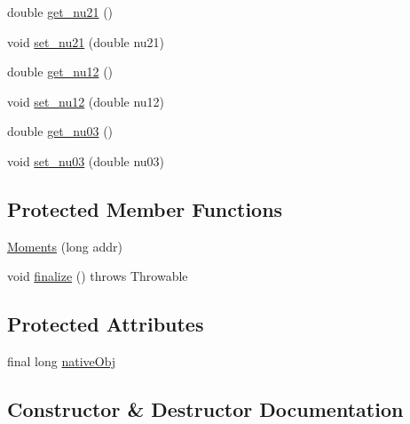 \begin{DoxyCompactItemize}
\item 
double \mbox{\hyperlink{classorg_1_1opencv_1_1imgproc_1_1_moments_ab7dc2e27ccd7f3a747f4fdc9043aeeb7}{get\+\_\+nu21}} ()
\item 
void \mbox{\hyperlink{classorg_1_1opencv_1_1imgproc_1_1_moments_a02efc273fdd3f7250dd54d375f46be7d}{set\+\_\+nu21}} (double nu21)
\item 
double \mbox{\hyperlink{classorg_1_1opencv_1_1imgproc_1_1_moments_a3682cf47b6ca0f92ee674602a0aeaf4b}{get\+\_\+nu12}} ()
\item 
void \mbox{\hyperlink{classorg_1_1opencv_1_1imgproc_1_1_moments_a886ad8b1384c63feeb00b8392969920a}{set\+\_\+nu12}} (double nu12)
\item 
double \mbox{\hyperlink{classorg_1_1opencv_1_1imgproc_1_1_moments_a2680f4c917f0814b2164b8347ec701c0}{get\+\_\+nu03}} ()
\item 
void \mbox{\hyperlink{classorg_1_1opencv_1_1imgproc_1_1_moments_a723ab4f48116159e5819f68f49124c7f}{set\+\_\+nu03}} (double nu03)
\end{DoxyCompactItemize}
\subsection*{Protected Member Functions}
\begin{DoxyCompactItemize}
\item 
\mbox{\hyperlink{classorg_1_1opencv_1_1imgproc_1_1_moments_a7a5aabc0525c636cd984b48e02ddfd20}{Moments}} (long addr)
\item 
void \mbox{\hyperlink{classorg_1_1opencv_1_1imgproc_1_1_moments_af35ed3538b49efa61376fd3451bd471d}{finalize}} ()  throws Throwable 
\end{DoxyCompactItemize}
\subsection*{Protected Attributes}
\begin{DoxyCompactItemize}
\item 
final long \mbox{\hyperlink{classorg_1_1opencv_1_1imgproc_1_1_moments_a5570a42e49c8c53cbd70457e28b80f3c}{native\+Obj}}
\end{DoxyCompactItemize}


\subsection{Constructor \& Destructor Documentation}
\mbox{\label{classorg_1_1opencv_1_1imgproc_1_1_moments_a7a5aabc0525c636cd984b48e02ddfd20}} 
